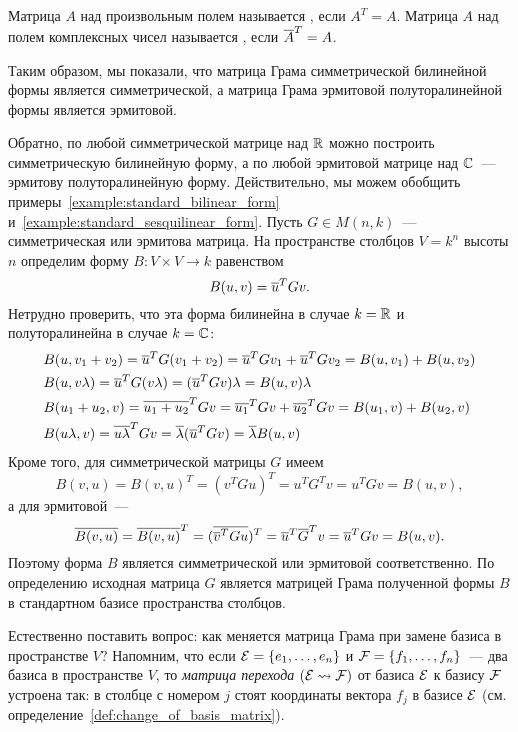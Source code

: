 \begin{definition}
Матрица $A$ над произвольным полем называется ,
если $A^T = A$. Матрица $A$ над полем комплексных чисел называется
, если $\overline{A}^T = A$.
\end{definition}

Таким образом, мы показали, что матрица Грама симметрической
билинейной формы является симметрической, а матрица Грама эрмитовой
полуторалинейной формы является эрмитовой.

Обратно, по любой симметрической матрице над $\mathbb R$ можно построить
симметрическую билинейную форму, а по любой эрмитовой матрице над $\mathbb
C$~--- эрмитову полуторалинейную форму. Действительно, мы можем
обобщить примеры~\ref{example:standard_bilinear_form}
и~\ref{example:standard_sesquilinear_form}.
Пусть $G\in M(n,k)$~--- симметрическая или эрмитова матрица. На
пространстве столбцов $V=k^n$ высоты $n$ определим форму
$B\colon V\times V\to k$ равенством
$$
B(u,v) = \overline{u}^TGv.
$$
Нетрудно проверить, что эта форма билинейна в случае $k=\mathbb R$ и
полуторалинейна в случае $k=\mathbb C$:
\begin{align*}
&B(u,v_1+v_2) = \overline{u}^T G(v_1+v_2) = \overline{u}^TGv_1 + \overline{u}^TGv_2 =
B(u,v_1) + B(u,v_2)\\
&B(u,v\lambda) = \overline{u}^T G(v\lambda) = (\overline{u}^TGv)\lambda = B(u,v)\lambda\\
&B(u_1+u_2,v) = \overline{u_1+u_2}^T Gv = \overline{u_1}^TGv + \overline{u_2}^TGv =
B(u_1,v) + B(u_2,v)\\
&B(u\lambda,v) = \overline{u\lambda}^T Gv = \overline\lambda(\overline{u}^TGv) =
\overline\lambda B(u,v)
\end{align*}
Кроме того, для симметрической матрицы $G$ имеем
$$
B(v,u) = B(v,u)^T = (v^T G u)^T = u^TG^Tv = u^TGv = B(u,v),
$$
а для эрмитовой~---
$$
\overline{B(v,u)} = \overline{B(v,u)}^T = (\overline{\overline{v}^TGu})^T = \overline{u}^T\overline{G}^Tv
= \overline{u}^T G v = B(u,v).
$$
Поэтому форма $B$ является симметрической или эрмитовой
соответственно. По определению исходная матрица $G$ является матрицей
Грама полученной формы $B$ в стандартном базисе пространства столбцов.

Естественно поставить вопрос: как меняется матрица Грама при замене
базиса в пространстве $V$?
Напомним, что если $\mathcal E=\{e_1,\dots,e_n\}$ и $\mathcal F=
\{f_1,\dots,f_n\}$~--- два базиса в пространстве $V$, то {\it
  матрица перехода} $(\mathcal E\rightsquigarrow\mathcal F)$ от базиса $\mathcal E$ к базису
$\mathcal F$ устроена так:
в столбце с номером $j$ стоят координаты вектора $f_j$ в базисе $\mathcal E$
(см. определение~\ref{def:change_of_basis_matrix}).

